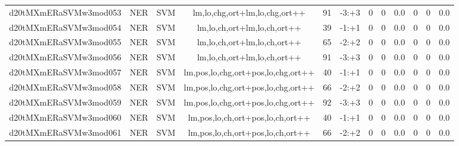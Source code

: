 \documentclass[a4paper]{article}
\begin{document}
\begin{landscape}
\begin{center}
\begin{tabular}{ |c|c|c|c|c|c|c|c|c|c|c|c|}
 	

 
 	
 	\small{ d20tMXmERaSVMw3mod053 } & \small{ NER} & \small{  SVM }  & lm,lo,chg,ort+lm,lo,chg,ort++  &  91 &  \small{  -3:+3 }  &  0 & 0 & 0.0  &  0 & 0 & 0.0 \\
 	

 
 	
 	\small{ d20tMXmERaSVMw3mod054 } & \small{ NER} & \small{  SVM }  & lm,lo,ch,ort+lm,lo,ch,ort++  &  39 &  \small{  -1:+1 }  &  0 & 0 & 0.0  &  0 & 0 & 0.0 \\
 	

 
 	
 	\small{ d20tMXmERaSVMw3mod055 } & \small{ NER} & \small{  SVM }  & lm,lo,ch,ort+lm,lo,ch,ort++  &  65 &  \small{  -2:+2 }  &  0 & 0 & 0.0  &  0 & 0 & 0.0 \\
 	

 
 	
 	\small{ d20tMXmERaSVMw3mod056 } & \small{ NER} & \small{  SVM }  & lm,lo,ch,ort+lm,lo,ch,ort++  &  91 &  \small{  -3:+3 }  &  0 & 0 & 0.0  &  0 & 0 & 0.0 \\
 	

 
 	
 	\small{ d20tMXmERaSVMw3mod057 } & \small{ NER} & \small{  SVM }  & lm,pos,lo,chg,ort+pos,lo,chg,ort++  &  40 &  \small{  -1:+1 }  &  0 & 0 & 0.0  &  0 & 0 & 0.0 \\
 	

 
 	
 	\small{ d20tMXmERaSVMw3mod058 } & \small{ NER} & \small{  SVM }  & lm,pos,lo,chg,ort+pos,lo,chg,ort++  &  66 &  \small{  -2:+2 }  &  0 & 0 & 0.0  &  0 & 0 & 0.0 \\
 	

 
 	
 	\small{ d20tMXmERaSVMw3mod059 } & \small{ NER} & \small{  SVM }  & lm,pos,lo,chg,ort+pos,lo,chg,ort++  &  92 &  \small{  -3:+3 }  &  0 & 0 & 0.0  &  0 & 0 & 0.0 \\
 	

 
 	
 	\small{ d20tMXmERaSVMw3mod060 } & \small{ NER} & \small{  SVM }  & lm,pos,lo,ch,ort+pos,lo,ch,ort++  &  40 &  \small{  -1:+1 }  &  0 & 0 & 0.0  &  0 & 0 & 0.0 \\
 	

 
 	
 	\small{ d20tMXmERaSVMw3mod061 } & \small{ NER} & \small{  SVM }  & lm,pos,lo,ch,ort+pos,lo,ch,ort++  &  66 &  \small{  -2:+2 }  &  0 & 0 & 0.0  &  0 & 0 & 0.0 \\
 	


\end{tabular}
\end{center}
\end{landscape}
\end{document}
